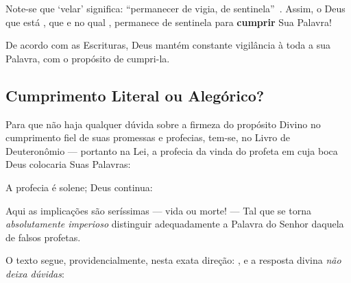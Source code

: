     Note-se que `velar' significa: ``permanecer de vigia,  de  sen\-ti\-ne\-la''~\cite{2009-Houaiss+Franco-Objetiva}.  Assim,  o
    Deus que está , que  e no qual , permanece de sentinela para \textbf{cumprir} Sua Palavra!

    \begin{PRI}
        \label{pri.vigilância}
        De acordo com as Escrituras, Deus mantém constante vigilância à toda a  sua  Palavra,  com  o  propósito  de
        cumpri-la.
    \end{PRI}


    \subsection{Cumprimento Literal ou Alegórico?}

    Para que não haja qualquer dúvida sobre a firmeza do propósito Divino no cumprimento fiel de  suas  promessas  e  profecias,
    tem-se, no Livro de Deuteronômio --- portanto na Lei, a profecia da vinda do  profeta  em  cuja  boca  Deus  colocaria  Suas
    Palavras:


    A profecia é solene; Deus continua:


    Aqui as implicações são seríssimas --- vida ou morte!  ---  Tal  que  se  torna  \emph{absolutamente  imperioso}  distinguir
    adequadamente a Palavra do Senhor daquela de falsos profetas.

    O texto segue, providencialmente, nesta exata direção: , e a resposta divina \emph{não deixa dúvidas}:

